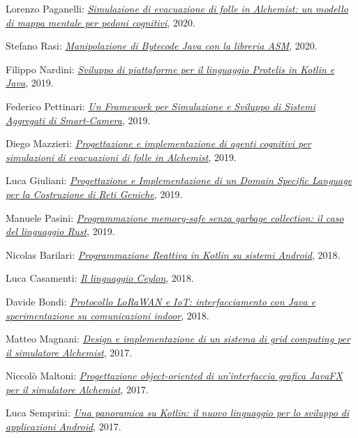 \begin{innerlist}
    \item Lorenzo Paganelli: \href{https://amslaurea.unibo.it/20540/}{\textit{Simulazione di evacuazione di folle in Alchemist: un modello di mappa mentale per pedoni cognitivi}}, 2020.
    \item Stefano Rasi: \href{https://amslaurea.unibo.it/20505/}{\textit{Manipolazione di Bytecode Java con la libreria ASM}}, 2020.
    \item Filippo Nardini: \href{https://amslaurea.unibo.it/19778/}{\textit{Sviluppo di piattaforme per il linguaggio Protelis in Kotlin e Java}}, 2019.
    \item Federico Pettinari: \href{https://amslaurea.unibo.it/19092/}{\textit{Un Framework per Simulazione e Sviluppo di Sistemi Aggregati di Smart-Camera}}, 2019.
    \item Diego Mazzieri: \href{https://amslaurea.unibo.it/19084/}{\textit{Progettazione e implementazione di agenti cognitivi per simulazioni di evacuazioni di folle in Alchemist}}, 2019.
    \item Luca Giuliani: \href{https://amslaurea.unibo.it/19071/}{\textit{Progettazione e Implementazione di un Domain Specific Language per la Costruzione di Reti Geniche}}, 2019.
    \item Manuele Pasini: \href{http://amslaurea.unibo.it/18535/}{\textit{Programmazione memory-safe senza garbage collection: il caso del linguaggio Rust}}, 2019.
    \item Nicolas Barilari: \href{http://amslaurea.unibo.it/16841/}{\textit{Programmazione Reattiva in Kotlin su sistemi Android}}, 2018.
    \item Luca Casamenti: \href{http://amslaurea.unibo.it/16788/}{\textit{Il linguaggio Ceylon}}, 2018.
    \item Davide Bondi: \href{http://amslaurea.unibo.it/15730/}{\textit{Protocollo LoRaWAN e IoT: interfacciamento con Java e sperimentazione su comunicazioni indoor}}, 2018.
    \item Matteo Magnani: \href{http://amslaurea.unibo.it/17133/}{\textit{Design e implementazione di un sistema di grid computing per il simulatore Alchemist}}, 2017.
    \item Niccolò Maltoni: \href{http://amslaurea.unibo.it/14682/}{\textit{Progettazione object-oriented di un'interfaccia grafica JavaFX per il simulatore Alchemist}}, 2017.
    \item Luca Semprini: \href{http://amslaurea.unibo.it/14673/}{\textit{Una panoramica su Kotlin: il nuovo linguaggio per lo sviluppo di applicazioni Android}}, 2017.

\end{innerlist}
